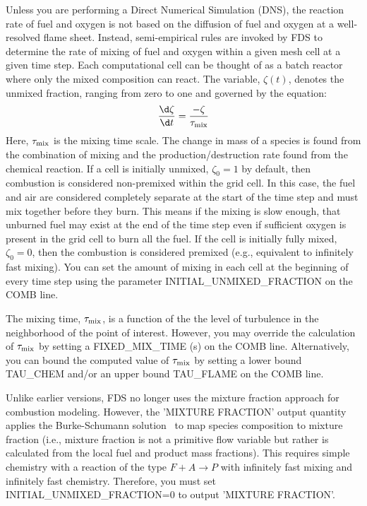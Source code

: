 \documentclass[11pt]{book}
\begin{document}
Unless you are performing a Direct Numerical Simulation (DNS), the reaction rate of fuel and oxygen is not based on the diffusion of fuel and oxygen at a well-resolved flame sheet. Instead, semi-empirical rules are invoked by FDS to determine the rate of mixing of fuel and oxygen within a given mesh cell at a given time step. Each computational cell can be thought of as a batch reactor where only the mixed composition can react. The variable, $\zeta(t)$, denotes the unmixed fraction, ranging from zero to one and governed by the equation:
\begin{equation}
\frac{\d \zeta}{\d t}=\frac{-\zeta}{\tau_{\rm mix}}
\label{eq:edc_mix}
\end{equation}
Here, $\tau_{\rm mix}$ is the mixing time scale. The change in mass of a species is found from the combination of mixing and the production/destruction rate found from the chemical reaction. If a cell is initially unmixed, $\zeta_0=1$ by default, then combustion is considered non-premixed within the grid cell.  In this case, the fuel and air are considered completely separate at the start of the time step and must mix together before they burn.  This means if the mixing is slow enough, that unburned fuel may exist at the end of the time step even if sufficient oxygen is present in the grid cell to burn all the fuel. If the cell is initially fully mixed, $\zeta_0=0$, then the combustion is considered premixed (e.g., equivalent to infinitely fast mixing). You can set the amount of mixing in each cell at the beginning of every time step using the parameter {\ct INITIAL\_UNMIXED\_FRACTION} on the {\ct COMB} line.

The mixing time, $\tau_{\rm mix}$, is a function of the the level of turbulence in the neighborhood of the point of interest. However, you may override the calculation of $\tau_{\rm mix}$ by setting a {\ct FIXED\_MIX\_TIME} (s) on the {\ct COMB} line. Alternatively, you can bound the computed value of $\tau_{\rm mix}$ by setting a lower bound {\ct TAU\_CHEM} and/or an upper bound {\ct TAU\_FLAME} on the {\ct COMB} line.

Unlike earlier versions, FDS no longer uses the mixture fraction approach for combustion modeling. However, the {\ct 'MIXTURE FRACTION'} output quantity applies the Burke-Schumann solution~\cite{Turns:1996} to map species composition to mixture fraction (i.e., mixture fraction is not a primitive flow variable but rather is calculated from the local fuel and product mass fractions).  This requires simple chemistry with a reaction of the type $\si{F} + \si{A} \rightarrow \si {P}$ with infinitely fast mixing and infinitely fast chemistry.  Therefore, you must set {\ct INITIAL\_UNMIXED\_FRACTION=0} to output {\ct 'MIXTURE FRACTION'}.
\end{document}

